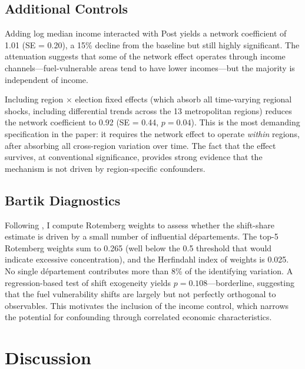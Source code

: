 \documentclass[12pt]{article}
\newcommand{\dept}{d\'{e}partement}
\newcommand{\depts}{d\'{e}partements}
\begin{document}
\subsection{Additional Controls}

Adding log median income interacted with Post yields a network coefficient of 1.01 (SE = 0.20), a 15\% decline from the baseline but still highly significant. The attenuation suggests that some of the network effect operates through income channels---fuel-vulnerable areas tend to have lower incomes---but the majority is independent of income.

Including region $\times$ election fixed effects (which absorb all time-varying regional shocks, including differential trends across the 13 metropolitan regions) reduces the network coefficient to 0.92 (SE = 0.44, $p = 0.04$). This is the most demanding specification in the paper: it requires the network effect to operate \emph{within} regions, after absorbing all cross-region variation over time. The fact that the effect survives, at conventional significance, provides strong evidence that the mechanism is not driven by region-specific confounders.

\subsection{Bartik Diagnostics}

Following \citet{goldsmith2020bartik}, I compute Rotemberg weights to assess whether the shift-share estimate is driven by a small number of influential \depts{}. The top-5 Rotemberg weights sum to 0.265 (well below the 0.5 threshold that would indicate excessive concentration), and the Herfindahl index of weights is 0.025. No single \dept{} contributes more than 8\% of the identifying variation. A regression-based test of shift exogeneity yields $p = 0.108$---borderline, suggesting that the fuel vulnerability shifts are largely but not perfectly orthogonal to observables. This motivates the inclusion of the income control, which narrows the potential for confounding through correlated economic characteristics.



\section{Discussion}
\label{sec:discussion}
\end{document}
